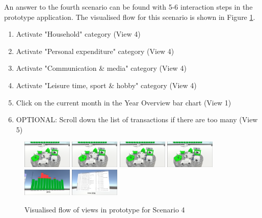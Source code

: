 An answer to the fourth scenario can be found with 5-6 interaction steps in the prototype application. The visualised flow for this scenario is shown in Figure \ref{fig:scenariofourprototype}.
\begin{enumerate}
	\item Activate "Household" category (View 4)
	\item Activate "Personal expenditure" category (View 4)
	\item Activate "Communication \& media" category (View 4)
	\item Activate "Leisure time, sport \& hobby" category (View 4)
	\item Click on the current month in the Year Overview bar chart (View 1)
	\item OPTIONAL: Scroll down the list of transactions if there are too many (View 5)
\end{enumerate}
\begin{figure}[h]
	\begin{center}
		\includegraphics[width=2.35cm]{03_Figures/08_Development/View4_CategoriesFiltering.png}
		\includegraphics[width=2.35cm]{03_Figures/08_Development/View4_CategoriesFiltering.png}
		\includegraphics[width=2.35cm]{03_Figures/08_Development/View4_CategoriesFiltering.png}
		\includegraphics[width=2.35cm]{03_Figures/08_Development/View4_CategoriesFiltering.png}
		\includegraphics[width=2.35cm]{03_Figures/08_Development/View1_YearOverview.png}
		\includegraphics[width=2.35cm]{03_Figures/08_Development/View5_FinTransactionsOverview.png}
		\caption{Visualised flow of views in prototype for Scenario 4}
		\label{fig:scenariofourprototype}
	\end{center}
\end{figure}

